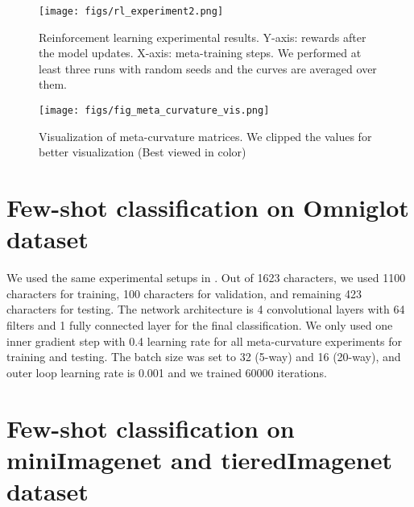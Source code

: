 \documentclass{article}
\begin{document}
\begin{figure*}[t]
\begin{center}
\centerline{\texttt{[image: figs/rl\_experiment2.png]}}
\caption{Reinforcement learning experimental results. Y-axis: rewards after the model updates. X-axis: meta-training steps. We performed at least three runs with random seeds and the curves are averaged over them.}
\label{fig:rl_experiment}
\end{center}
\end{figure*}

\begin{figure}[t]
\begin{center}
\centerline{\texttt{[image: figs/fig\_meta\_curvature\_vis.png]}}
\caption{Visualization of meta-curvature matrices. We clipped the values  for better visualization (Best viewed in color)}
\label{fig:meta_curvature_vis}
\end{center}
\end{figure}

\section{Few-shot classification on Omniglot dataset}
We used the same experimental setups in \cite{Finn-icml-2017}. Out of 1623 characters, we used 1100 characters for training, 100 characters for validation, and remaining 423 characters for testing. The network architecture is 4 convolutional layers with 64 filters and 1 fully connected layer for the final classification. We only used one inner gradient step with 0.4 learning rate for all meta-curvature experiments for training and testing. The batch size was set to 32 (5-way) and 16 (20-way), and outer loop learning rate is 0.001 and we trained 60000 iterations.

\section{Few-shot classification on miniImagenet and tieredImagenet dataset}
\end{document}
